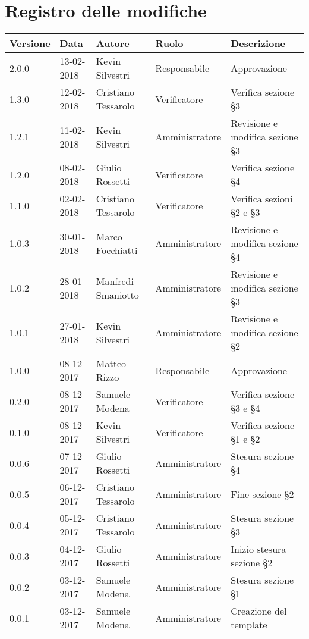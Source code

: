 \documentclass[./NormediProgetto.tex]{subfiles}
\begin{document}
\chapter*{Registro delle modifiche}
\setlength\LTleft{-22mm}
\begin{longtable}{|p{20mm}|p{20mm}|p{40mm}|p{30mm}|p{50mm}|}
	\hline
	\textbf{Versione} & \textbf{Data} & \textbf{Autore} & \textbf{Ruolo} & \textbf{Descrizione} \\ \hline 
		2.0.0 & 13-02-2018 & Kevin Silvestri & Responsabile & Approvazione\\ \hline
		1.3.0 & 12-02-2018 & Cristiano Tessarolo & Verificatore &  Verifica sezione §3\\ \hline
		1.2.1 & 11-02-2018 & Kevin Silvestri & Amministratore & Revisione e modifica sezione §3\\ \hline
		1.2.0 & 08-02-2018 & Giulio Rossetti & Verificatore & Verifica sezione §4\\ \hline  
		1.1.0 & 02-02-2018 & Cristiano Tessarolo & Verificatore & Verifica sezioni §2 e §3\\ \hline 
		1.0.3 & 30-01-2018 & Marco Focchiatti & Amministratore & Revisione e modifica sezione §4\\ \hline 
		1.0.2 & 28-01-2018 & Manfredi Smaniotto & Amministratore & Revisione e modifica sezione §3\\ \hline 
		1.0.1 & 27-01-2018 & Kevin Silvestri & Amministratore & Revisione e modifica sezione §2\\ \hline 
		1.0.0 & 08-12-2017 & Matteo Rizzo & Responsabile & Approvazione\\ \hline
		0.2.0 & 08-12-2017 & Samuele Modena & Verificatore & Verifica sezione §3 e §4\\ \hline
		0.1.0 & 08-12-2017 & Kevin Silvestri & Verificatore & Verifica sezione §1 e §2\\ \hline
		0.0.6 & 07-12-2017 & Giulio Rossetti & Amministratore & Stesura sezione §4\\ \hline
		0.0.5 & 06-12-2017 & Cristiano Tessarolo & Amministratore & Fine sezione §2\\ \hline
		0.0.4 & 05-12-2017 & Cristiano Tessarolo & Amministratore & Stesura sezione §3\\ \hline
		0.0.3 & 04-12-2017 & Giulio Rossetti & Amministratore & Inizio stesura sezione §2\\ \hline
		0.0.2 & 03-12-2017 & Samuele Modena & Amministratore & Stesura sezione §1\\ \hline
		0.0.1 & 03-12-2017 & Samuele Modena & Amministratore & Creazione del template\\ \hline
\end{longtable}
\end{document}
